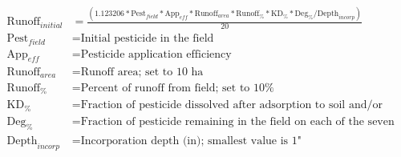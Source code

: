 \documentclass[fleqn, oneside, 11pt]{article}%
\begin{document}
\begin{preview}
\begin{align*}%
\text{Runoff}_{initial} & = \frac{(1.123206 * \text{Pest}_{field} * \text{App}_{eff} * \text{Runoff}_{area} * \text{Runoff}_{\%} * \text{KD}_{\%} * \text{Deg}_{\%} / \text{Depth}_{incorp})}{20}  \nonumber \\
\text{Pest}_{field} & = \text{Initial pesticide in the field} \\
\text{App}_{eff} & = \text{Pesticide application efficiency} \\
\text{Runoff}_{area} & = \text{Runoff area; set to 10 ha} \\
\text{Runoff}_{\%} & = \text{Percent of runoff from field; set to 10\%} \\
\text{KD}_{\%} & = \text{Fraction of pesticide dissolved after adsorption to soil and/or organic matter} \\
\text{Deg}_{\%} & = \text{Fraction of pesticide remaining in the field on each of the seven days post application} \\
\text{Depth}_{incorp} & = \text{Incorporation depth (in); smallest value is 1"} \\
\end{align*} 
\end{preview}
\end{document}

